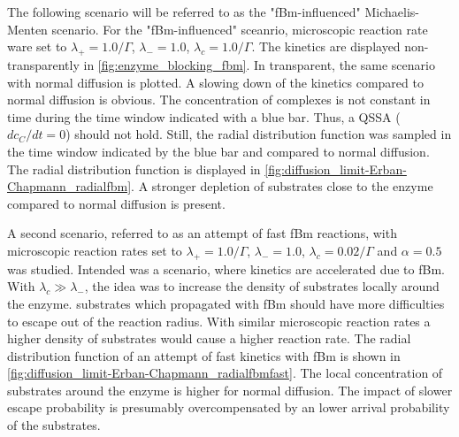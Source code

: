 \documentclass[
  a4paper,BCOR10mm,twoside,
  headsepline,footsepline,%
  fleqn,openbib
]{scrbook}
\begin{document}
The following scenario will be referred to as the "fBm-influenced" Michaelis-Menten scenario. For the "fBm-influenced" sceanrio, microscopic reaction rate ware set to  $\lambda_+=1.0/\Gamma$, $\lambda_-=1.0$,  $\lambda_c=1.0/\Gamma$. The kinetics are displayed non-transparently in \cref{fig:enzyme_blocking_fbm}. In transparent, the same scenario with normal diffusion is plotted. A slowing down of the kinetics compared to normal diffusion is obvious. The concentration of complexes is not constant in time during the time window indicated with a blue bar. Thus, a QSSA ($dc_C/dt=0$) should not hold. Still, the radial distribution function was sampled in the time window indicated by the blue bar and compared to normal diffusion. The radial distribution function is displayed in \cref{fig:diffusion_limit-Erban-Chapmann_radialfbm}. A stronger depletion of substrates close to the enzyme compared to normal diffusion is present. \par
A second scenario, referred to as an attempt of fast fBm reactions, with microscopic reaction rates set to  $\lambda_+=1.0/\Gamma$, $\lambda_-=1.0$,  $\lambda_c=0.02/\Gamma$  and $\alpha=0.5$ was studied. Intended was a scenario, where kinetics are accelerated due to fBm. With $\lambda_c \gg\lambda_-$, the idea was to increase the density of substrates locally around the enzyme. substrates which propagated with fBm should have more difficulties to escape out of the reaction radius. With similar microscopic reaction rates a higher density of substrates would cause a higher reaction rate. The radial distribution function of an attempt of fast kinetics with fBm is shown in \cref{fig:diffusion_limit-Erban-Chapmann_radialfbmfast}. The local concentration of substrates around the enzyme is higher for normal diffusion. The impact of slower escape probability is presumably overcompensated by an lower arrival probability of the substrates.
\newpage
\end{document}
